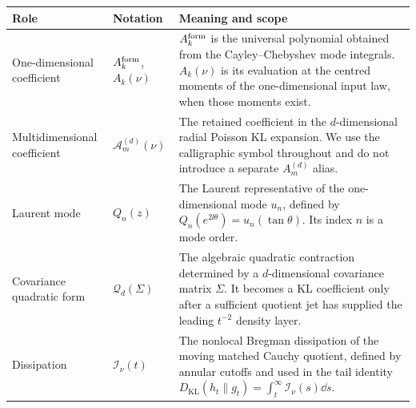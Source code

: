 \begin{center}
\begin{tabularx}{\textwidth}{@{}p{}p{}X@{}}
\textbf{Role} & \textbf{Notation} & \textbf{Meaning and scope} \\
\hline
One-dimensional coefficient &
\(A_k^{\rm form}\), \(A_k(\nu)\) &
\(A_k^{\rm form}\) is the universal polynomial obtained from the
Cayley--Chebyshev mode integrals.  \(A_k(\nu)\) is its evaluation at the
centred moments of the one-dimensional input law, when those moments exist. \\
Multidimensional coefficient &
\(\mathcal A_m^{(d)}(\nu)\) &
The retained coefficient in the \(d\)-dimensional radial Poisson KL expansion.
We use the calligraphic symbol throughout and do not introduce a separate
\(A_m^{(d)}\) alias. \\
Laurent mode &
\(Q_n(z)\) &
The Laurent representative of the one-dimensional mode \(u_n\), defined by
\(Q_n(e^{2\ii\theta})=u_n(\tan\theta)\).  Its index \(n\) is a mode order. \\
Covariance quadratic form &
\(\mathcal Q_d(\Sigma)\) &
The algebraic quadratic contraction determined by a \(d\)-dimensional
covariance matrix \(\Sigma\).  It becomes a KL coefficient only after a
sufficient quotient jet has supplied the leading \(t^{-2}\) density layer. \\
Dissipation &
\(\mathcal I_\nu(t)\) &
The nonlocal Bregman dissipation of the moving matched Cauchy quotient,
defined by annular cutoffs and used in the tail identity
\(D_{\mathrm{KL}}(h_t\|g_t)=\int_t^\infty\mathcal I_\nu(s)\dd s\). \\
\end{tabularx}
\end{center}
